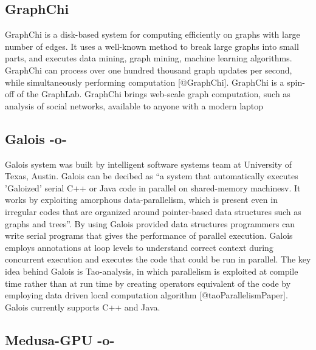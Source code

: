 \subsection{GraphChi}

GraphChi is a disk-based system for computing efficiently on graphs
with large number of edges.  It uses a well-known method to break
large graphs into small parts, and executes data mining, graph mining,
machine learning algorithms. GraphChi can process over one hundred
thousand graph updates per second, while simultaneously performing
computation [@GraphChi]. GraphChi is a spin-off of the
GraphLab. GraphChi brings web-scale graph computation, such as
analysis of social networks, available to anyone with a modern laptop

     
\subsection{Galois -o-}
     
Galois system was built by intelligent software systems team at
University of Texas, Austin. Galois can be decibed as ``a system that
automatically executes 'Galoized' serial C++ or Java code in
parallel on shared-memory machinesv\cite{www-galoisSite}. It works by
exploiting amorphous data-parallelism, which is present even in
irregular codes that are organized around pointer-based data
structures such as graphs and trees''. By using Galois provided data
structures programmers can write serial programs that gives the
performance of parallel execution. Galois employs annotations at loop
levels to understand correct context during concurrent execution and
executes the code that could be run in parallel. The key idea behind
Galois is Tao-analysis, in which parallelism is exploited at compile
time rather than at run time by creating operators equivalent of the
code by employing data driven local computation
algorithm [@taoParallelismPaper]. Galois currently supports C++
and Java.


     
\subsection{Medusa-GPU -o-}
     
